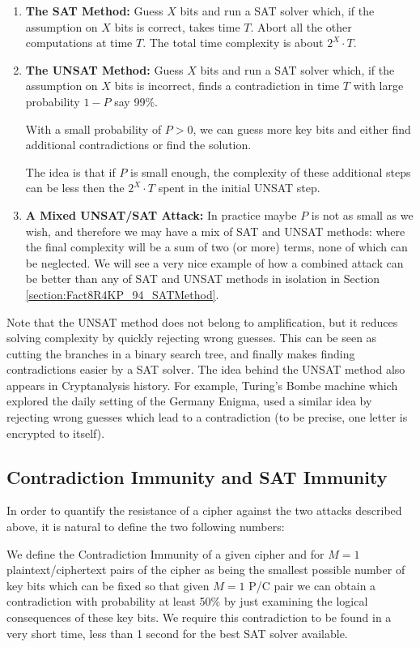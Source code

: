 \begin{enumerate}
	\item
	{\bf The SAT Method:}
	Guess $X$ bits and run a SAT solver which,
	if the assumption on $X$ bits is correct, takes time $T$.
	Abort all the other computations at time $T$.
	The total time complexity is about $2^{X}\cdot T$.
	\item
	{\bf The UNSAT Method:}
	Guess $X$ bits and run a SAT solver which,
	if the assumption on $X$ bits is incorrect,
	finds a contradiction in time $T$
	with large probability $1-P$ say 99$\%$.
	
	With a small probability of $P>0$,
	we can guess more key bits
	and either find additional contradictions
	or find the solution.
	
	The idea is that if $P$ is small enough, the complexity of
	these additional steps can be less then the $2^{X}\cdot T$ spent
	in the initial UNSAT step.
	
	\item
	{\bf A Mixed UNSAT/SAT Attack:}
	In practice maybe $P$ is not as small as we wish, and therefore we may have
	a mix of SAT and UNSAT methods:
	where the final complexity will be a sum of two (or more) terms, none of which can be neglected.
	We will see a very nice example of
	how a combined attack can be better
	than any of SAT and UNSAT methods in isolation
	in Section \ref{section:Fact8R4KP_94_SATMethod}.
\end{enumerate}

Note that the UNSAT method does not belong to amplification, but it reduces solving complexity by quickly rejecting wrong guesses. This can be seen as cutting the branches in a binary search tree, and finally makes finding contradictions easier by a SAT solver. The idea behind the UNSAT method also appears in Cryptanalysis history. For example, Turing's Bombe machine which explored the daily setting of the Germany Enigma, used a similar idea by rejecting wrong guesses which lead to a contradiction (to be precise, one letter is encrypted to itself).

\subsection{Contradiction Immunity and SAT Immunity}
In order to quantify the resistance of a cipher against the two attacks described above,
it is natural to define the two following numbers:

\begin{mydef}
	We define the
	Contradiction Immunity of
	a given cipher
	and for $M=1$ plaintext/ciphertext pairs
	of the
	cipher as being
	the smallest possible
	number of key bits
	which can be fixed so that
	given $M=1$ P/C pair we
	can obtain a contradiction
	with probability at least
	50$\%$ by just
	examining the logical consequences
	of these key bits.
	We require this contradiction
	to be found in a very short time,
	less than 1 second for
	the best SAT solver available.
\end{mydef}

